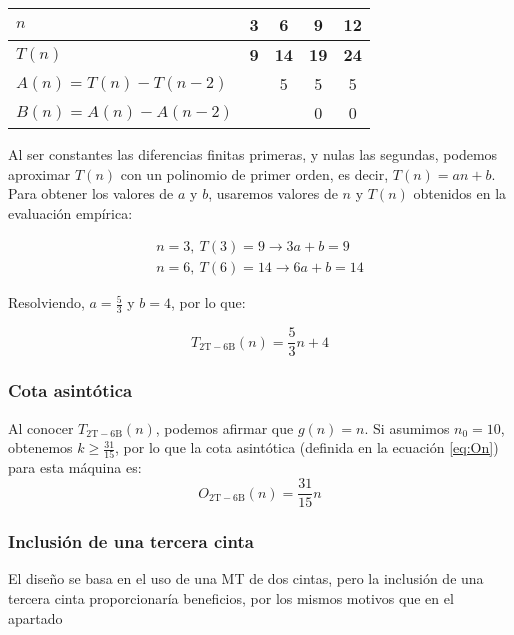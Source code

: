 \begin{table}[H]
    \centering
    \begin{tabular}{|l|c|c|c|c|}
        \hline
        $n$    & \textbf{3} & \textbf{6}  & \textbf{9}  & \textbf{12} \\ \hline
        $T(n)$ & \textbf{9} & \textbf{14} & \textbf{19} & \textbf{24} \\ \hline
        \hline
        $A(n) = T(n) - T(n-2)$ &   & 5 & 5 & 5 \\ \hline
        $B(n) = A(n) - A(n-2)$ &   &   & 0 & 0 \\ \hline
    \end{tabular}
\end{table}

Al ser constantes las diferencias finitas primeras, y nulas las segundas, podemos aproximar $T(n)$ con un polinomio de primer orden, es decir, $T(n) = an + b$.\\

Para obtener los valores de $a$ y $b$, usaremos valores de $n$ y $T(n)$ obtenidos en la evaluación empírica:

\begin{subequations}
    \begin{gather}
        n = 3,\ T(3) = 9 \rightarrow 3a + b = 9 \\
        n = 6,\ T(6) = 14 \rightarrow 6a + b = 14
    \end{gather}
\end{subequations}

Resolviendo, $a=\frac{5}{3}$ y $b=4$, por lo que:

\begin{equation}
    T_{\mathrm{2T-6B}}(n) = \frac{5}{3}n + 4
\end{equation}


\subsubsection*{Cota asintótica}
Al conocer $T_{\mathrm{2T-6B}}(n)$, podemos afirmar que $g(n) = n$. Si asumimos $n_0 = 10$, obtenemos $k \geq \frac{31}{15}$, por lo que la cota asintótica (definida en la ecuación \ref{eq:On}) para esta máquina es:
\begin{equation}
    O_{\mathrm{2T-6B}}(n) = \frac{31}{15} n
\end{equation}



\subsubsection*{Inclusión de una tercera cinta}
El diseño se basa en el uso de una MT de dos cintas, pero la inclusión de una tercera cinta proporcionaría beneficios, por los mismos motivos que en el apartado 

